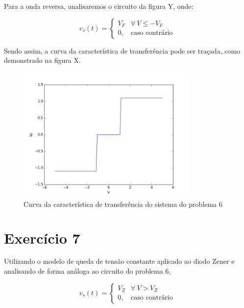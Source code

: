 \documentclass[12pt, a4paper, twoside]{article}
\begin{document}
Para a onda reversa, analisaremos o circuito da figura Y, onde:


\begin{equation}
    v_s(t) =
    \begin{cases}
        V_F & \forall\ V \leq -V_F \\
        0, & \text{caso contrário}
    \end{cases}
\end{equation}

Sendo assim, a curva da característica de transferência pode ser traçada, como
demonstrado na figura X.
\begin{figure}
    \centering
    \includegraphics[width=0.8\textwidth]{figs/rel3/ex6.png}
    \caption{Curva da característica de transferência do sistema do problema 6}
\end{figure}

\section{Exercício 7}

Utilizando o modelo de queda de tensão constante aplicado ao diodo Zener e
analisando de forma análoga ao circuito do problema 6,


\begin{equation}
    v_s(t) =
    \begin{cases}
        V_Z & \forall\ V > V_Z \\
        0, & \text{caso contrário}
    \end{cases}
\end{equation}
\end{document}
